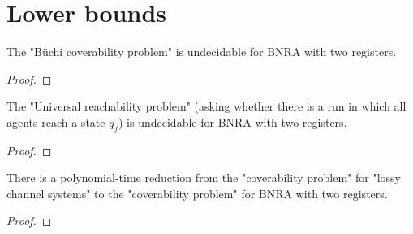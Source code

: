 \section{Lower bounds}

\begin{proposition}
	The "Büchi coverability problem" is undecidable for BNRA with two registers.
\end{proposition}

\begin{proof}
\end{proof}

\begin{proposition}
	The "Universal reachability problem" (asking whether there is a run in which all agents reach a state $q_f$) is undecidable for BNRA with two registers.
\end{proposition}

\begin{proof}
\end{proof}

\begin{proposition}
	There is a polynomial-time reduction from the "coverability problem" for "lossy channel systems" to the "coverability problem" for BNRA with two registers.
\end{proposition}

\begin{proof}
\end{proof}